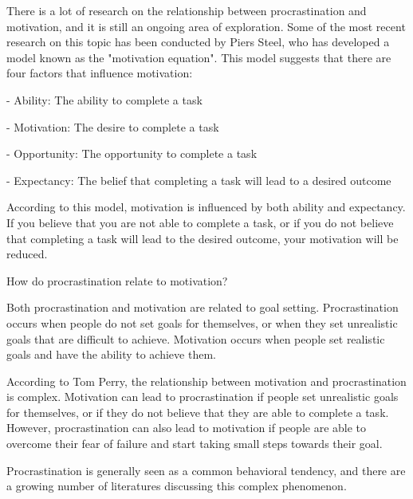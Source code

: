 
There is a lot of research on the relationship between procrastination and motivation,
and it is still an ongoing area of exploration. Some of the most recent research on this topic has been conducted by Piers Steel, who has developed a model known as the "motivation equation". This model suggests that there are four factors that influence motivation:


- Ability: The ability to complete a task

- Motivation: The desire to complete a task

- Opportunity: The opportunity to complete a task

- Expectancy: The belief that completing a task will lead to a desired outcome


According to this model, motivation is influenced by both ability and expectancy. If you believe that you are not able to complete a task, or if you do not believe that completing a task will lead to the desired outcome, your motivation will be reduced.




How do procrastination relate to motivation?

Both procrastination and motivation are related to goal setting. Procrastination occurs when people do not set goals for themselves, or when they set unrealistic goals that are difficult to achieve. Motivation occurs when people set realistic goals and have the ability to achieve them.


According to Tom Perry, the relationship between motivation and procrastination is complex. Motivation can lead to procrastination if people set unrealistic goals for themselves, or if they do not believe that they are able to complete a task. However, procrastination can also lead to motivation if people are able to overcome their fear of failure and start taking small steps towards their goal.


Procrastination is generally seen as a common behavioral tendency, and there are a growing number of literatures discussing this complex phenomenon.


